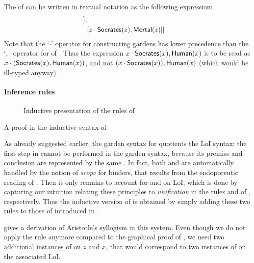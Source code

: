 \begin{scope}
\begin{example}
  The  of  can be written in textual
  notation as the following expression:
  \begin{align*}
    [&x \cdot \socrates(x),\human(x), \\
     &[y \cdot \human(y),[{} \cdot \mortal(y)]], \\
     &[z \cdot \socrates(z),\mortal(z)]]
  \end{align*}
  Note that the `$\cdot$' operator for constructing gardens has lower precedence
  than the `$,$' operator for  of . Thus the expression $x
  \cdot \mbox{\textsf{Socrates}}(x),\mbox{\textsf{Human}}(x)$ is to be read as $x \cdot
  (\mbox{\textsf{Socrates}}(x),\mbox{\textsf{Human}}(x))$, and not $(x \cdot \mbox{\textsf{Socrates}}(x)),\mbox{\textsf{Human}}(x)$ (which
  would be ill-typed anyway).
\end{example}

\paragraph{Inference rules}

\begin{figure}
  
  \caption{Inductive presentation of the rules of }
\end{figure}

\begin{marginfigure}
  
  \caption{A proof in the inductive syntax of }
\end{marginfigure}

As already suggested earlier, the garden syntax for  quotients the
LoI syntax: the first  step in 
cannot be performed in the garden syntax, because its premiss and conclusion are
represented by the same . In fact, both  and
 are automatically handled by the notion of \emph{scope} for
binders, that results from the endoporeutic reading of . Then it only
remains to account for  and  on LoI, which is done
by capturing our intuition relating these principles to \emph{unification} in
the rules  and  of , respectively.
Thus the inductive version of  is obtained by simply adding these two
rules to those of  introduced in .

 gives a derivation of Aristotle's syllogism
in this system. Even though we do not apply the  rule anymore compared
to the graphical proof of , we need two additional
instances of  on $z$ and $x$, that would correspond to two
instances of  on the associated LoI.


\end{scope}
